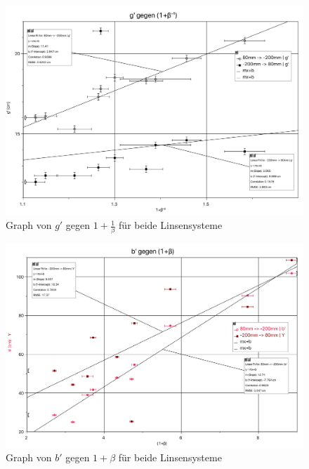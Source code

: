 \documentclass[11pt,a4paper]{article}
\begin{document}
\begin{figure}[h]
	\centering
	\includegraphics[width=\linewidth]{Abb4}
	\caption{Graph von $g'$ gegen $1+\frac{1}{\beta}$ für beide Linsensysteme}
\end{figure}

\begin{figure}[h]
	\centering
	\includegraphics[width=\linewidth]{Abb5}
	\caption{Graph von $b'$ gegen $1+\beta$ für beide Linsensysteme}
\end{figure}
\end{document}
